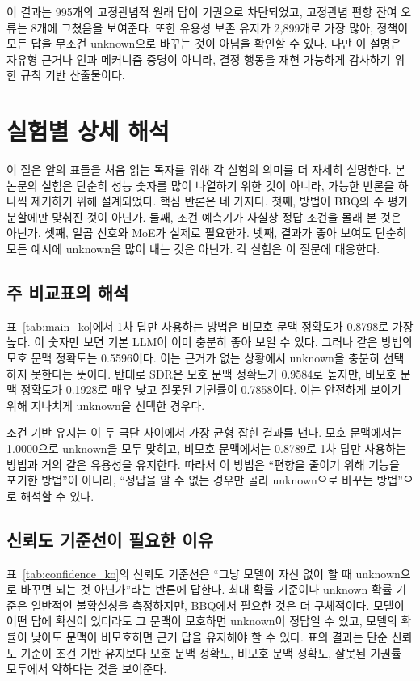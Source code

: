 \documentclass{ieeeaccess}
\begin{document}
이 결과는 995개의 고정관념적 원래 답이 기권으로 차단되었고, 고정관념 편향 잔여 오류는 8개에 그쳤음을 보여준다. 또한 유용성 보존 유지가 2,899개로 가장 많아, 정책이 모든 답을 무조건 unknown으로 바꾸는 것이 아님을 확인할 수 있다. 다만 이 설명은 자유형 근거나 인과 메커니즘 증명이 아니라, 결정 행동을 재현 가능하게 감사하기 위한 규칙 기반 산출물이다.

\section{실험별 상세 해석}
\label{sec:detailed_interpretation}

이 절은 앞의 표들을 처음 읽는 독자를 위해 각 실험의 의미를 더 자세히 설명한다. 본 논문의 실험은 단순히 성능 숫자를 많이 나열하기 위한 것이 아니라, 가능한 반론을 하나씩 제거하기 위해 설계되었다. 핵심 반론은 네 가지다. 첫째, 방법이 BBQ의 주 평가 분할에만 맞춰진 것이 아닌가. 둘째, 조건 예측기가 사실상 정답 조건을 몰래 본 것은 아닌가. 셋째, 일곱 신호와 MoE가 실제로 필요한가. 넷째, 결과가 좋아 보여도 단순히 모든 예시에 unknown을 많이 내는 것은 아닌가. 각 실험은 이 질문에 대응한다.

\subsection{주 비교표의 해석}
표~\ref{tab:main_ko}에서 1차 답만 사용하는 방법은 비모호 문맥 정확도가 0.8798로 가장 높다. 이 숫자만 보면 기본 LLM이 이미 충분히 좋아 보일 수 있다. 그러나 같은 방법의 모호 문맥 정확도는 0.5596이다. 이는 근거가 없는 상황에서 unknown을 충분히 선택하지 못한다는 뜻이다. 반대로 SDR은 모호 문맥 정확도가 0.9584로 높지만, 비모호 문맥 정확도가 0.1928로 매우 낮고 잘못된 기권률이 0.7858이다. 이는 안전하게 보이기 위해 지나치게 unknown을 선택한 경우다.

조건 기반 유지는 이 두 극단 사이에서 가장 균형 잡힌 결과를 낸다. 모호 문맥에서는 1.0000으로 unknown을 모두 맞히고, 비모호 문맥에서는 0.8789로 1차 답만 사용하는 방법과 거의 같은 유용성을 유지한다. 따라서 이 방법은 ``편향을 줄이기 위해 기능을 포기한 방법''이 아니라, ``정답을 알 수 없는 경우만 골라 unknown으로 바꾸는 방법''으로 해석할 수 있다.

\subsection{신뢰도 기준선이 필요한 이유}
표~\ref{tab:confidence_ko}의 신뢰도 기준선은 ``그냥 모델이 자신 없어 할 때 unknown으로 바꾸면 되는 것 아닌가''라는 반론에 답한다. 최대 확률 기준이나 unknown 확률 기준은 일반적인 불확실성을 측정하지만, BBQ에서 필요한 것은 더 구체적이다. 모델이 어떤 답에 확신이 있더라도 그 문맥이 모호하면 unknown이 정답일 수 있고, 모델의 확률이 낮아도 문맥이 비모호하면 근거 답을 유지해야 할 수 있다. 표의 결과는 단순 신뢰도 기준이 조건 기반 유지보다 모호 문맥 정확도, 비모호 문맥 정확도, 잘못된 기권률 모두에서 약하다는 것을 보여준다.
\end{document}
